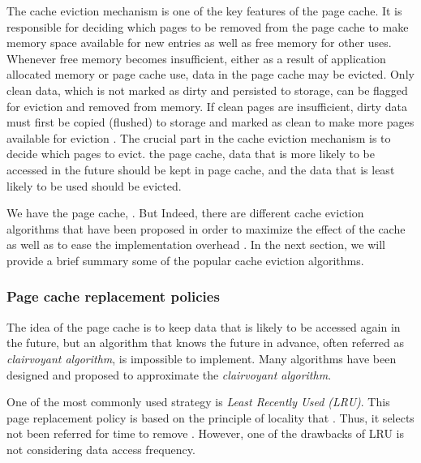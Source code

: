 The cache eviction mechanism is one of the key features of the
page cache. 
It is responsible for deciding which pages to be removed from the 
page cache to make memory space available for new entries as well as 
free memory for other uses. 
Whenever free memory becomes insufficient, either as a result of application 
allocated memory or page cache use, data in the page cache may be evicted. 
Only clean data, which is not marked as dirty and persisted to storage, 
can be flagged for eviction and removed from memory. 
If clean pages are insufficient, dirty data must first be copied (flushed) 
to storage and marked as clean to make more pages available for eviction 
\cite{linuxdev3rd2010,bovet2005understanding}. 
The crucial part in the cache eviction mechanism is to decide which pages 
to evict.  the page cache, data that is more likely 
to be accessed in the future should be kept in page cache, and the data 
that is least likely to be used should be evicted. 

We have  the page cache, . But 
Indeed, there are different cache eviction algorithms that have been 
proposed in order to maximize the effect of the cache as well as to 
ease the implementation overhead \cite{chavan2011comparison}.
In the next section, we will provide a brief summary some of the popular 
cache eviction algorithms.

\subsubsection{Page cache replacement policies}

The idea of the page cache is to keep data that is likely to be accessed again 
in the future, but an algorithm that knows the future in advance, often 
referred as \textit{clairvoyant algorithm}, is impossible to implement. 
Many algorithms have been designed and proposed to approximate the 
\textit{clairvoyant algorithm}. 

One of the most commonly used strategy is \textit{Least Recently Used (LRU)}. 
This page replacement policy is based on the principle of locality that 
. Thus, it selects  not been referred for  time to remove 
\cite{chavan2011comparison}. However, one of the drawbacks of LRU 
is not considering data access frequency.

